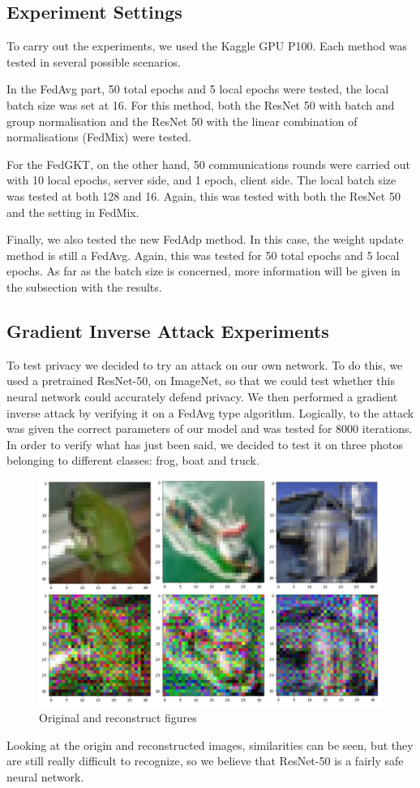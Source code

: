 \documentclass[conference]{IEEEtran}
\begin{document}
\subsection{Experiment Settings}
To carry out the experiments, we used the Kaggle GPU P100. Each method was tested in several possible scenarios.

In the FedAvg part, 50 total epochs and 5 local epochs were tested, the local batch size was set at 16. For this method, both the ResNet 50 with batch and group normalisation and the ResNet 50 with the linear combination of normalisations (FedMix) were tested.

For the FedGKT, on the other hand, 50 communications rounds were carried out with 10 local epochs, server side, and 1 epoch, client side. The local batch size was tested at both 128 and 16. Again, this was tested with both the ResNet 50 and the setting in FedMix.

Finally, we also tested the new FedAdp method. In this case, the weight update method is still a FedAvg. Again, this was tested for 50 total epochs and 5 local epochs. As far as the batch size is concerned, more information will be given in the subsection with the results.

\subsection{Gradient Inverse Attack Experiments}
To test privacy we decided to try an attack on our own network. To do this, we used a pretrained ResNet-50, on ImageNet, so that we could test whether this neural network could accurately defend privacy. We then performed a gradient inverse attack by verifying it on a FedAvg type algorithm.
Logically, to the attack was given the correct parameters of our model and was tested for 8000 iterations. In order to verify what has just been said, we decided to test it on three photos belonging to different classes: frog, boat and truck. 
\begin{figure}[H]
    \centering
    \includegraphics[width=\columnwidth]{Images/Comparison inverse attack.jpg}
    \caption{Original and reconstruct figures}
    \label{fig:1}
\end{figure}
Looking at the origin and reconstructed images, similarities can be seen, but they are still really difficult to recognize, so we believe that ResNet-50 is a fairly safe neural network.
\end{document}
